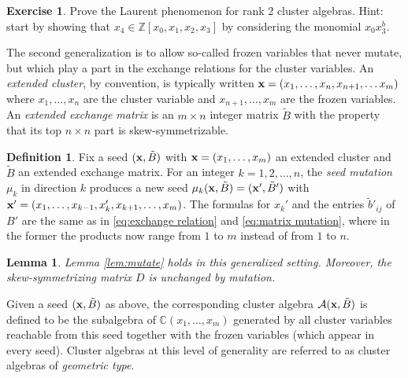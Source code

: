 \documentclass{amsart}
\newtheorem{lemma}[theorem]{Lemma}
\theoremstyle{definition}
\newtheorem{definition}[theorem]{Definition}
\newtheorem{exercise}[theorem]{Exercise}
\theoremstyle{remark}
\numberwithin{equation}{section}
\newcommand{\cA}{{\mathcal{A}}}
\newcommand{\x}{{\bf x}}
\newcommand{\CC}{{\mathbb{C}}}
\newcommand{\ZZ}{{\mathbb{Z}}}
\begin{document}
	\begin{exercise}\label{exercise:rank 2 Laurent phenomenon}
    Prove the Laurent phenomenon for rank 2 cluster algebras.  Hint: start by showing that $x_4\in\ZZ[x_0,x_1,x_2,x_3]$ by considering the monomial $x_0x_3^b$.
  \end{exercise}
	
	The second generalization is to allow so-called frozen variables that never mutate, but which play a part in the exchange relations for the cluster variables. An \emph{extended cluster}, by convention, is typically written $\x = (x_1,\ldots, x_n, x_{n+1},\ldots x_m)$ where $x_1,\ldots, x_n$ are the cluster variable and $x_{n+1},\ldots, x_m$ are the frozen variables.  An \emph{extended exchange matrix} is an $m \times n$ integer matrix $\tilde{B}$ with the property that its top $n \times n$ part is skew-symmetrizable.
	
	\begin{definition}
	Fix a seed $(\x, \tilde B)$ with $\x=(x_1,\ldots, x_m)$ an extended cluster and $\tilde{B}$ an extended exchange matrix.  For an integer $k = 1,2,\ldots, n$, the \emph{seed mutation} $\mu_k$ in direction $k$ produces a new seed $\mu_k(\x,\tilde{B}) = (\x',\tilde{B}')$ with $\x' = (x_1,\ldots, x_{k-1}, x_k', x_{k+1},\ldots, x_m)$.  The formulas for $x_k'$ and the entries $\tilde{b}'_{ij}$ of $B'$ are the same as in \eqref{eq:exchange relation} and \eqref{eq:matrix mutation}, where in the former the products now range from $1$ to $m$ instead of from $1$ to $n$.
	\end{definition}
	
	\begin{lemma}
	Lemma \ref{lem:mutate} holds in this generalized setting.  Moreover, the skew-symmetrizing matrix $D$ is unchanged by mutation.
	\end{lemma}
	
	Given a seed $(\x, \tilde{B})$ as above, the corresponding cluster algebra $\cA(\x, \tilde{B})$ is defined to be the subalgebra of $\CC(x_1,\ldots, x_m)$ generated by all cluster variables reachable from this seed together with the frozen variables (which appear in every seed).  Cluster algebras at this level of generality are referred to as cluster algebras of \emph{geometric type}.
	
\end{document}
